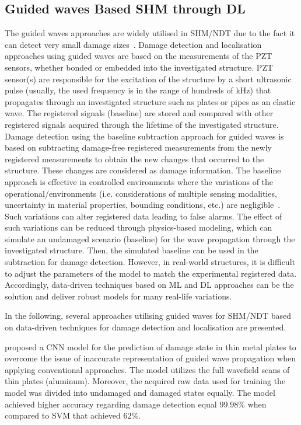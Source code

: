 \subsection{Guided waves Based SHM through DL}
The guided waves approaches are widely utilised in SHM/NDT due to the fact it can detect very small damage sizes~\cite{Guemes2020}. 
Damage detection and localisation approaches using guided waves are based on the measurements of the PZT sensors, whether bonded or embedded into the investigated structure. 
PZT sensor(s) are responsible for the excitation of the structure by a short ultrasonic pulse (usually, the used frequency is in the range of hundreds of kHz) that propagates through an investigated structure such as plates or pipes as an elastic wave.
The registered signals (baseline) are stored and compared with other registered signals acquired through the lifetime of the investigated structure.
Damage detection using the baseline subtraction approach for guided waves is based on subtracting damage-free registered measurements from the newly registered measurements to obtain the new changes that occurred to the structure.
These changes are considered as damage information.
The baseline approach is effective in controlled environments where the variations of the operational/environments (i.e. considerations of multiple sensing modalities, uncertainty in material properties, bounding conditions, etc.) are negligible~\cite{Yuan2020}.  
Such variations can alter registered data leading to false alarms.
The effect of such variations can be reduced through physics-based modeling, which can simulate an undamaged scenario (baseline) for the wave propagation through the investigated structure.
Then, the simulated baseline can be used in the subtraction for damage detection.
However, in real-world structures, it is difficult to adjust the parameters of the model to match the experimental registered data.
Accordingly, data-driven techniques based on ML and DL approaches can be the solution and deliver robust models for many real-life variations.

In the following, several approaches utilising guided waves for SHM/NDT based on data-driven techniques for damage detection and localisation are presented.

\textcite{Melville1949} proposed a CNN model for the prediction of damage state in thin metal plates to overcome the issue of inaccurate representation of guided wave propagation when applying conventional approaches. 
The model utilizes the full wavefield scans of thin plates (aluminum).
Moreover, the acquired raw data used for training the model was divided into undamaged and damaged states equally.
The model achieved higher accuracy regarding damage detection equal \(99.98\%\) when compared to SVM that achieved \(62\%\).

